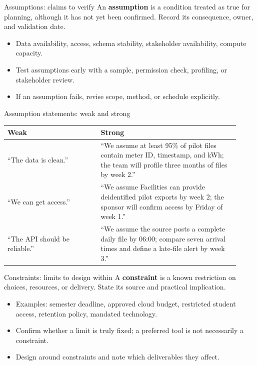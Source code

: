 \documentclass[aspectratio=43,12pt]{beamer}
\begin{document}
\begin{frame}{Assumptions: claims to verify}
An \textbf{assumption} is a condition treated as true for planning, although it has not yet been confirmed. Record its consequence, owner, and validation date.
\vspace{0.7em}
\begin{itemize}
\item Data availability, access, schema stability, stakeholder availability, compute capacity.
\item Test assumptions early with a sample, permission check, profiling, or stakeholder review.
\item If an assumption fails, revise scope, method, or schedule explicitly.
\end{itemize}
\end{frame}

\begin{frame}{Assumption statements: weak and strong}
\small
\begin{tabular}{p{0.375\linewidth}p{0.55\linewidth}}
\textbf{Weak} & \textbf{Strong}\\\hline
``The data is clean.'' & ``We assume at least 95\% of pilot files contain meter ID, timestamp, and kWh; the team will profile three months of files by week 2.''\\[0.7em]
``We can get access.'' & ``We assume Facilities can provide deidentified pilot exports by week 2; the sponsor will confirm access by Friday of week 1.''\\[0.7em]
``The API should be reliable.'' & ``We assume the source posts a complete daily file by 06:00; compare seven arrival times and define a late-file alert by week 3.''
\end{tabular}
\end{frame}

\begin{frame}{Constraints: limits to design within}
A \textbf{constraint} is a known restriction on choices, resources, or delivery. State its source and practical implication.
\vspace{0.7em}
\begin{itemize}
\item Examples: semester deadline, approved cloud budget, restricted student access, retention policy, mandated technology.
\item Confirm whether a limit is truly fixed; a preferred tool is not necessarily a constraint.
\item Design around constraints and note which deliverables they affect.
\end{itemize}
\end{frame}
\end{document}
